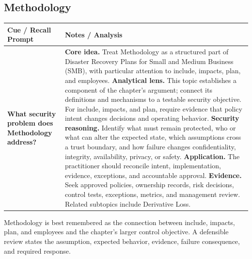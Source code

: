 \documentclass[11pt]{article}
\newcommand{\CornellHeader}{%
\rowcolor{Navy}\color{white}\bfseries Cue / Recall Prompt & \color{white}\bfseries Notes / Analysis\\\hline}
\newcommand{\CornellRow}[2]{%
\cellcolor{CueGray}\RaggedRight\textbf{#1} & \RaggedRight #2\\\hline}
\begin{document}
\subsection*{Methodology}
\begin{longtable}{>{\RaggedRight\arraybackslash}p{}|>{\RaggedRight\arraybackslash}p{}}
\CornellHeader
\CornellRow{What security problem does Methodology address?}{\textbf{Core idea.} Treat Methodology as a structured part of Disaster Recovery Plans for Small and Medium Business (SMB), with particular attention to include, impacts, plan, and employees. \textbf{Analytical lens.} This topic establishes a component of the chapter's argument; connect its definitions and mechanisms to a testable security objective. For include, impacts, and plan, require evidence that policy intent changes decisions and operating behavior. \textbf{Security reasoning.} Identify what must remain protected, who or what can alter the expected state, which assumptions cross a trust boundary, and how failure changes confidentiality, integrity, availability, privacy, or safety. \textbf{Application.} The practitioner should reconcile intent, implementation, evidence, exceptions, and accountable approval. \textbf{Evidence.} Seek approved policies, ownership records, risk decisions, control tests, exceptions, metrics, and management review. Related subtopics include Derivative Loss.}
\end{longtable}
\begin{topicsummary}
Methodology is best remembered as the connection between include, impacts, plan, and employees and the chapter's larger control objective. A defensible review states the assumption, expected behavior, evidence, failure consequence, and required response.
\end{topicsummary}
\end{document}
